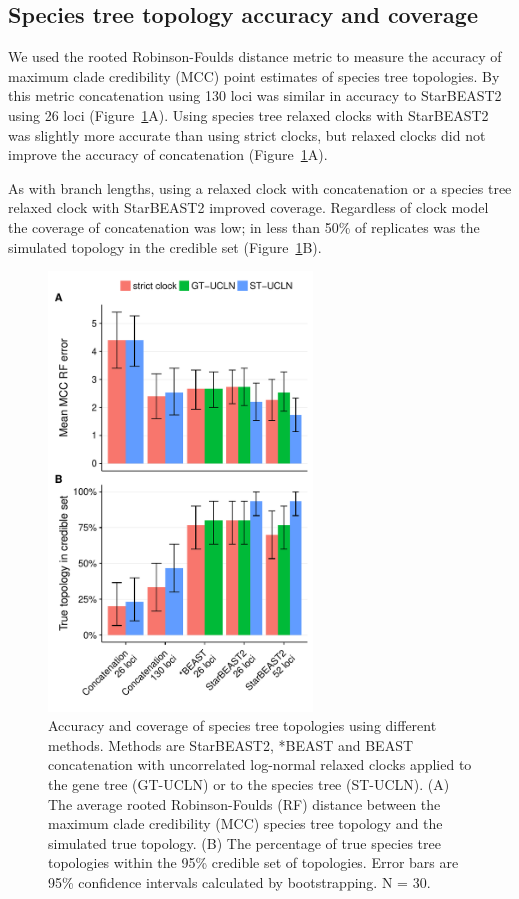 \documentclass[12pt]{article}
\begin{document}
\subsection{Species tree topology accuracy and coverage}

We used the rooted Robinson-Foulds distance metric to measure the accuracy of
maximum clade credibility (MCC) point estimates of species tree topologies. By
this metric concatenation using 130 loci was similar in accuracy to StarBEAST2
using 26 loci (Figure~\ref{fig:treeTopologyError}A). Using species tree
relaxed clocks with StarBEAST2 was slightly more accurate than using strict
clocks, but relaxed clocks did not improve the accuracy of concatenation
(Figure~\ref{fig:treeTopologyError}A).

As with branch lengths, using a relaxed clock with concatenation or a species
tree relaxed clock with StarBEAST2 improved coverage. Regardless of clock
model the coverage of concatenation was low; in less than 50\% of replicates
was the simulated topology in the credible set
(Figure~\ref{fig:treeTopologyError}B).

\begin{figure}[htb!]
\centering
\includegraphics[width=70mm]{topology_accuracy_phased.pdf}
\caption
{Accuracy and coverage of species tree topologies using different methods.
Methods are StarBEAST2, *BEAST and BEAST concatenation with uncorrelated
log-normal relaxed clocks applied to the gene tree (GT-UCLN) or to the species
tree (ST-UCLN). (A) The average rooted Robinson-Foulds (RF) distance between the
maximum clade credibility (MCC) species tree topology and the
simulated true topology. (B) The percentage of true species tree topologies
within the 95\% credible set of topologies. Error bars are 95\% confidence
intervals calculated by bootstrapping. N = 30.}
\label{fig:treeTopologyError}
\end{figure}
\end{document}
